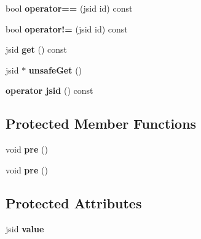 \begin{DoxyCompactItemize}
\item 
\hypertarget{classjs_1_1_encapsulated_id_a1c227998ffb4fdb94dcbab19ffba5c3f}{bool {\bfseries operator==} (jsid id) const }\label{classjs_1_1_encapsulated_id_a1c227998ffb4fdb94dcbab19ffba5c3f}

\item 
\hypertarget{classjs_1_1_encapsulated_id_a27ffc392252fe9cce65b152714171bb0}{bool {\bfseries operator!=} (jsid id) const }\label{classjs_1_1_encapsulated_id_a27ffc392252fe9cce65b152714171bb0}

\item 
\hypertarget{classjs_1_1_encapsulated_id_ae9aa446e1cedd7c13e3ef3a5d83ee6e8}{jsid {\bfseries get} () const }\label{classjs_1_1_encapsulated_id_ae9aa446e1cedd7c13e3ef3a5d83ee6e8}

\item 
\hypertarget{classjs_1_1_encapsulated_id_a8da9b41e7361b1a05dd7cd478d68106e}{jsid $\ast$ {\bfseries unsafe\-Get} ()}\label{classjs_1_1_encapsulated_id_a8da9b41e7361b1a05dd7cd478d68106e}

\item 
\hypertarget{classjs_1_1_encapsulated_id_aeb0733c506051cf35deae1289af31e4d}{{\bfseries operator jsid} () const }\label{classjs_1_1_encapsulated_id_aeb0733c506051cf35deae1289af31e4d}

\end{DoxyCompactItemize}
\subsection*{Protected Member Functions}
\begin{DoxyCompactItemize}
\item 
\hypertarget{classjs_1_1_encapsulated_id_acfb2f013c6d8e8f780528eaea0375c2a}{void {\bfseries pre} ()}\label{classjs_1_1_encapsulated_id_acfb2f013c6d8e8f780528eaea0375c2a}

\item 
\hypertarget{classjs_1_1_encapsulated_id_acfb2f013c6d8e8f780528eaea0375c2a}{void {\bfseries pre} ()}\label{classjs_1_1_encapsulated_id_acfb2f013c6d8e8f780528eaea0375c2a}

\end{DoxyCompactItemize}
\subsection*{Protected Attributes}
\begin{DoxyCompactItemize}
\item 
\hypertarget{classjs_1_1_encapsulated_id_afa23fd28f2153ef922db0907f6db157a}{jsid {\bfseries value}}\label{classjs_1_1_encapsulated_id_afa23fd28f2153ef922db0907f6db157a}

\end{DoxyCompactItemize}


